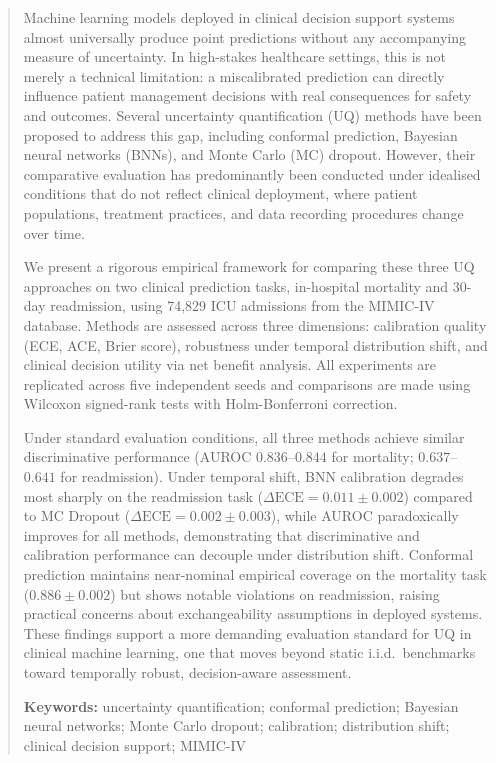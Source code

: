 \documentclass[11pt,a4paper]{article}
\newcommand{\ECE}{\mathrm{ECE}}
\begin{document}
\begin{abstract}
Machine learning models deployed in clinical decision support systems almost universally produce point predictions without any accompanying measure of uncertainty. In high-stakes healthcare settings, this is not merely a technical limitation: a miscalibrated prediction can directly influence patient management decisions with real consequences for safety and outcomes. Several uncertainty quantification (UQ) methods have been proposed to address this gap, including conformal prediction, Bayesian neural networks (BNNs), and Monte Carlo (MC) dropout. However, their comparative evaluation has predominantly been conducted under idealised conditions that do not reflect clinical deployment, where patient populations, treatment practices, and data recording procedures change over time.

We present a rigorous empirical framework for comparing these three UQ approaches on two clinical prediction tasks, in-hospital mortality and 30-day readmission, using 74,829 ICU admissions from the MIMIC-IV database. Methods are assessed across three dimensions: calibration quality (ECE, ACE, Brier score), robustness under temporal distribution shift, and clinical decision utility via net benefit analysis. All experiments are replicated across five independent seeds and comparisons are made using Wilcoxon signed-rank tests with Holm-Bonferroni correction.

Under standard evaluation conditions, all three methods achieve similar discriminative performance (AUROC $0.836$--$0.844$ for mortality; $0.637$--$0.641$ for readmission). Under temporal shift, BNN calibration degrades most sharply on the readmission task ($\Delta\ECE = 0.011 \pm 0.002$) compared to MC Dropout ($\Delta\ECE = 0.002 \pm 0.003$), while AUROC paradoxically improves for all methods, demonstrating that discriminative and calibration performance can decouple under distribution shift. Conformal prediction maintains near-nominal empirical coverage on the mortality task ($0.886 \pm 0.002$) but shows notable violations on readmission, raising practical concerns about exchangeability assumptions in deployed systems. These findings support a more demanding evaluation standard for UQ in clinical machine learning, one that moves beyond static i.i.d.\ benchmarks toward temporally robust, decision-aware assessment.

\vspace{0.5em}
\noindent\textbf{Keywords:} uncertainty quantification; conformal prediction; Bayesian neural networks; Monte Carlo dropout; calibration; distribution shift; clinical decision support; MIMIC-IV
\end{abstract}
\end{document}
